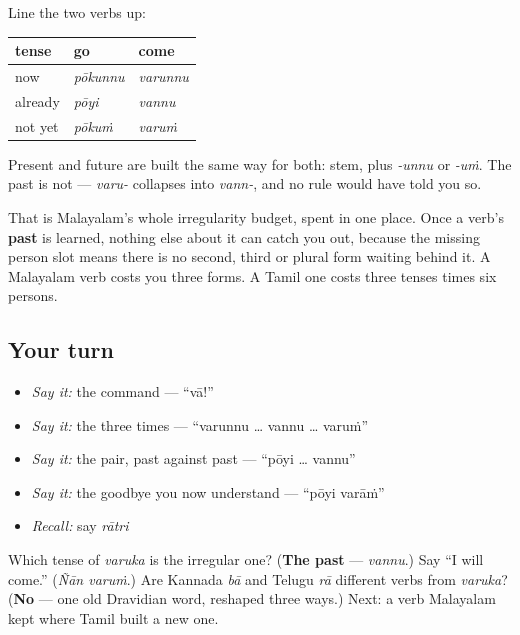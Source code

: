 \begin{grammarlens}[title={Grammar Lens: where Malayalam keeps its irregularity}]
Line the two verbs up:

\noindent
\begin{tabularx}{\linewidth}{@{}>{\raggedright\arraybackslash}X>{\raggedright\arraybackslash}X>{\raggedright\arraybackslash}X@{}}
\toprule
\textbf{tense} & \textbf{go} & \textbf{come} \\
\midrule
now & \emph{pōkunnu} & \emph{varunnu} \\
already & \emph{pōyi} & \emph{vannu} \\
not yet & \emph{pōkuṁ} & \emph{varuṁ} \\
\bottomrule
\end{tabularx}

Present and future are built the same way for both: stem, plus \emph{-unnu} or \emph{-uṁ}. The past is not — \emph{varu-} collapses into \emph{vann-}, and no rule would have told you so.

That is Malayalam's whole irregularity budget, spent in one place. Once a verb's \textbf{past} is learned, nothing else about it can catch you out, because the missing person slot means there is no second, third or plural form waiting behind it. A Malayalam verb costs you three forms. A Tamil one costs three tenses times six persons.
\end{grammarlens}

\subsection*{Your turn}
\begin{itemize}
\raggedright
  \item \emph{Say it:} the command — \textquotedblleft{}vā!\textquotedblright{}
  \item \emph{Say it:} the three times — \textquotedblleft{}varunnu … vannu … varuṁ\textquotedblright{}
  \item \emph{Say it:} the pair, past against past — \textquotedblleft{}pōyi … vannu\textquotedblright{}
  \item \emph{Say it:} the goodbye you now understand — \textquotedblleft{}pōyi varāṁ\textquotedblright{}
  \item \emph{Recall:} say \emph{rātri}
\end{itemize}

\begin{tcolorbox}[breakable,colback=teal!4,colframe=teal!35!black,title={Before you move on}]
Which tense of \emph{varuka} is the irregular one? (\textbf{The past} — \emph{vannu}.) Say \textquotedblleft{}I will come.\textquotedblright{} (\emph{Ñān varuṁ}.) Are Kannada \emph{bā} and Telugu \emph{rā} different verbs from \emph{varuka}? (\textbf{No} — one old Dravidian word, reshaped three ways.) Next: a verb Malayalam kept where Tamil built a new one.
\end{tcolorbox}
